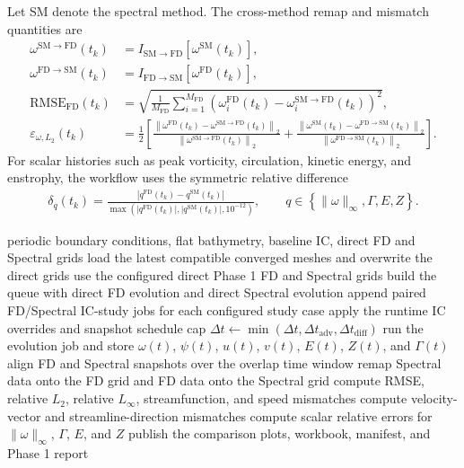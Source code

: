 \documentclass[11pt]{article}
\begin{document}
Let SM denote the spectral method. The cross-method remap and mismatch quantities are
\begin{align}
\omega^{\mathrm{SM}\rightarrow \mathrm{FD}}(t_k) &=
I_{\mathrm{SM}\rightarrow \mathrm{FD}}\!\left[\omega^{\mathrm{SM}}(t_k)\right],
\\
\omega^{\mathrm{FD}\rightarrow \mathrm{SM}}(t_k) &=
I_{\mathrm{FD}\rightarrow \mathrm{SM}}\!\left[\omega^{\mathrm{FD}}(t_k)\right],
\\
\mathrm{RMSE}_{\mathrm{FD}}(t_k) &=
\sqrt{\frac{1}{M_{\mathrm{FD}}}
\sum_{i=1}^{M_{\mathrm{FD}}}
\left(\omega_i^{\mathrm{FD}}(t_k) -
\omega_i^{\mathrm{SM}\rightarrow \mathrm{FD}}(t_k)\right)^2},
\\
\varepsilon_{\omega,L_2}(t_k) &=
\frac{1}{2}\left[
\frac{\left\|\omega^{\mathrm{FD}}(t_k) -
\omega^{\mathrm{SM}\rightarrow \mathrm{FD}}(t_k)\right\|_2}
{\left\|\omega^{\mathrm{SM}\rightarrow \mathrm{FD}}(t_k)\right\|_2}
+
\frac{\left\|\omega^{\mathrm{SM}}(t_k) -
\omega^{\mathrm{FD}\rightarrow \mathrm{SM}}(t_k)\right\|_2}
{\left\|\omega^{\mathrm{FD}\rightarrow \mathrm{SM}}(t_k)\right\|_2}
\right].
\end{align}
For scalar histories such as peak vorticity, circulation, kinetic energy, and enstrophy, the workflow uses the symmetric relative difference
\begin{align}
\delta_q(t_k) =
\frac{\left|q^{\mathrm{FD}}(t_k) - q^{\mathrm{SM}}(t_k)\right|}
{\max\!\left(\left|q^{\mathrm{FD}}(t_k)\right|,
\left|q^{\mathrm{SM}}(t_k)\right|, 10^{-12}\right)},
\qquad
q \in \left\{\|\omega\|_{\infty}, \Gamma, E, Z\right\}.
\end{align}

\begin{algorithm}[t]
\caption{Phase 1 periodic FD-vs-Spectral workflow}
\begin{algorithmic}[1]
\Require periodic boundary conditions, flat bathymetry, baseline IC, direct FD and Spectral grids
    \State load the latest compatible converged meshes and overwrite the direct grids
\Else
    \State use the configured direct Phase 1 FD and Spectral grids
\EndIf
\State build the queue with direct FD evolution and direct Spectral evolution
\State append paired FD/Spectral IC-study jobs for each configured study case
    \State apply the runtime IC overrides and snapshot schedule
        \State cap $\Delta t \leftarrow \min(\Delta t,\Delta t_{\mathrm{adv}},\Delta t_{\mathrm{diff}})$
    \EndIf
    \State run the evolution job and store $\omega(t)$, $\psi(t)$, $u(t)$, $v(t)$, $E(t)$, $Z(t)$, and $\Gamma(t)$
\EndFor
\State align FD and Spectral snapshots over the overlap time window
\State remap Spectral data onto the FD grid and FD data onto the Spectral grid
\State compute RMSE, relative $L_2$, relative $L_{\infty}$, streamfunction, and speed mismatches
\State compute velocity-vector and streamline-direction mismatches
\State compute scalar relative errors for $\|\omega\|_{\infty}$, $\Gamma$, $E$, and $Z$
\State publish the comparison plots, workbook, manifest, and Phase 1 report
\end{algorithmic}
\end{algorithm}
\end{document}
